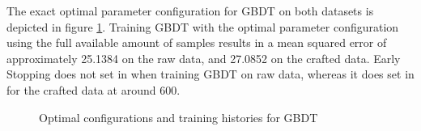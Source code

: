 The exact optimal parameter configuration for GBDT on both datasets is depicted in figure \ref{fig:GBDT_Optimal}. Training GBDT with the optimal parameter configuration using the full available amount of samples results in a mean squared error of approximately 25.1384 on the raw data, and 27.0852 on the crafted data. Early Stopping does not set in when training GBDT on raw data, whereas it does set in for the crafted data at around 600. 
\begin{figure}[h]
	\centering
	\caption{Optimal configurations and training histories for GBDT}
	\label{fig:GBDT_Optimal}
\end{figure}

